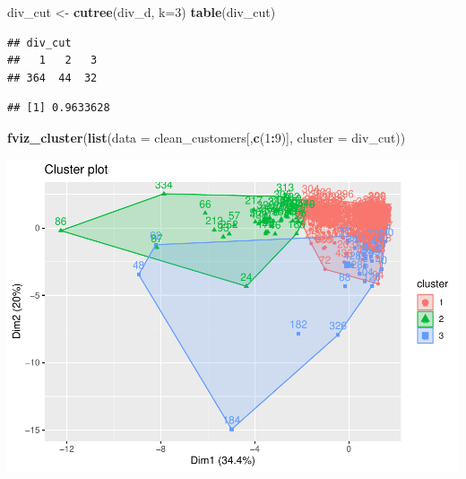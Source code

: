 \documentclass[
  english,
  man]{apa6}
\newenvironment{Shaded}{\begin{snugshade}}{\end{snugshade}}
\newcommand{\DataTypeTok}[1]{\textcolor[rgb]{0.13,0.29,0.53}{#1}}
\newcommand{\DecValTok}[1]{\textcolor[rgb]{0.00,0.00,0.81}{#1}}
\newcommand{\KeywordTok}[1]{\textcolor[rgb]{0.13,0.29,0.53}{\textbf{#1}}}
\newcommand{\NormalTok}[1]{#1}
\newcommand{\OperatorTok}[1]{\textcolor[rgb]{0.81,0.36,0.00}{\textbf{#1}}}
\newcommand{\StringTok}[1]{\textcolor[rgb]{0.31,0.60,0.02}{#1}}
\begin{document}
\begin{Shaded}
\begin{Highlighting}[]
\NormalTok{div_cut <-}\StringTok{ }\KeywordTok{cutree}\NormalTok{(div_d, }\DataTypeTok{k=}\DecValTok{3}\NormalTok{)}
\KeywordTok{table}\NormalTok{(div_cut)}
\end{Highlighting}
\end{Shaded}

\begin{verbatim}
## div_cut
##   1   2   3 
## 364  44  32
\end{verbatim}

\begin{Shaded}
\end{Shaded}

\begin{verbatim}
## [1] 0.9633628
\end{verbatim}

\begin{Shaded}
\begin{Highlighting}[]
\KeywordTok{fviz_cluster}\NormalTok{(}\KeywordTok{list}\NormalTok{(}\DataTypeTok{data =}\NormalTok{ clean_customers[,}\KeywordTok{c}\NormalTok{(}\DecValTok{1}\OperatorTok{:}\DecValTok{9}\NormalTok{)], }\DataTypeTok{cluster =}\NormalTok{ div_cut))}
\end{Highlighting}
\end{Shaded}

\includegraphics{MSDS680-Week-6-Kmeans-and-HCA_files/figure-latex/divisive-2.pdf}
\end{document}
